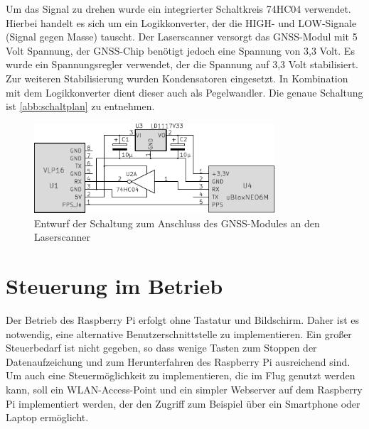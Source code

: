 \documentclass[a4paper,12pt,bibliography=totoc, listof=totoc,titlepage,pointlessnumbers]{scrreprt}
\begin{document}
Um das Signal zu drehen wurde ein integrierter Schaltkreis 74HC04 verwendet. Hierbei handelt es sich um ein Logikkonverter, der die HIGH- und LOW-Signale (Signal gegen Masse) tauscht. Der Laser\-scan\-ner versorgt das GNSS-Modul mit 5 Volt Spannung, der GNSS-Chip benötigt jedoch eine Spannung von 3,3 Volt. Es wurde ein Spannungsregler verwendet, der die Spannung auf 3,3 Volt stabilisiert. Zur weiteren Stabilisierung wurden Kondensatoren eingesetzt. In Kombination mit dem Logikkonverter dient dieser auch als Pegelwandler. Die genaue Schaltung ist \autoref{abb:schaltplan} zu entnehmen.

\begin{figure}[!ht]
 \centering
 \includegraphics[width=0.8\textwidth]{img/schaltplanGnss.pdf}
 \caption{Entwurf der Schaltung zum Anschluss des GNSS-Modules an den Laser\-scan\-ner}
 \label{abb:schaltplan}
\end{figure}

\section{Steuerung im Betrieb}
\label{s:steuermodul}
Der Betrieb des Rasp\-berry Pi erfolgt ohne Tastatur und Bildschirm. Daher ist es notwendig, eine alternative Benutzerschnittstelle zu implementieren. Ein großer Steuerbedarf ist nicht gegeben, so dass wenige Tasten zum Stoppen der Datenaufzeichung und zum Herunterfahren des Rasp\-berry Pi ausreichend sind. Um auch eine Steuermöglichkeit zu implementieren, die im Flug genutzt werden kann, soll ein WLAN-Access-Point und ein simpler Webserver auf dem Rasp\-berry Pi implementiert werden, der den Zugriff zum Beispiel über ein Smartphone oder Laptop ermöglicht.
\end{document}
